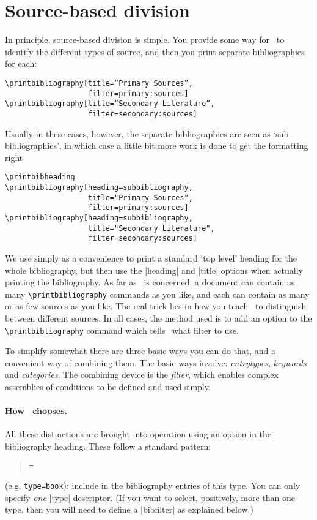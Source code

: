 \section{Source-based division}

In principle, source-based division is simple. You provide some way for
\biblatex\ to identify the different types of source, and then you print
separate bibliographies for each:

\begin{Verbatim}
\printbibliography[title=“Primary Sources”,
                   filter=primary:sources]
\printbibliography[title=“Secondary Literature”,
                   filter=secondary:sources]
\end{Verbatim}
Usually in these cases, however, the separate bibliographies are seen
as `sub-bibliographies', in which case a little bit more work is
done to get the formatting right

\begin{Verbatim}
\printbibheading
\printbibliography[heading=subbibliography,
                   title="Primary Sources",
                   filter=primary:sources]
\printbibliography[heading=subbibliography,
                   title="Secondary Literature",
                   filter=secondary:sources]
\end{Verbatim}
We use  simply as a convenience to print a
standard `top level' heading for the whole bibliography, but then use
the |heading| and |title| options when actually printing the
bibliography. As far as \biblatex\ is concerned, a document can contain
as many \texttt{\textbackslash{}printbibliography} commands as you
like, and each can contain as many or as few sources as you like.  The
real trick lies in how you teach \biblatex\ to distinguish between
different sources. In all cases, the method used is to add an option
to the \texttt{\textbackslash{}printbibliography} command which tells
\biblatex\ what filter to use.

To simplify somewhat there are three basic ways you can do that, and a
convenient way of combining them. The basic ways involve:
\emph{entrytypes}, \emph{keywords} and \emph{categories}. The
combining device is the \emph{filter}, which enables complex
assemblies of conditions to be defined and used simply.

\paragraph{How \biblatex\ chooses.} All these distinctions are brought
into operation using an option in the bibliography heading. These
follow a standard pattern:
\begin{quote}
 \texttt{=} 
\end{quote}
(e.g. \texttt{type=book}): include in the bibliography entries of this
type. You can only specify \emph{one} |type| descriptor. (If you want
to select, positively, more than one type, then you will need to
define a |bibfilter| as explained below.)

